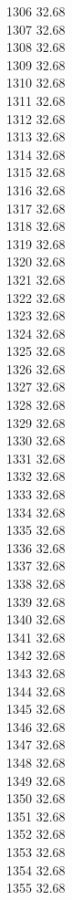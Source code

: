 1306	32.68\\
1307	32.68\\
1308	32.68\\
1309	32.68\\
1310	32.68\\
1311	32.68\\
1312	32.68\\
1313	32.68\\
1314	32.68\\
1315	32.68\\
1316	32.68\\
1317	32.68\\
1318	32.68\\
1319	32.68\\
1320	32.68\\
1321	32.68\\
1322	32.68\\
1323	32.68\\
1324	32.68\\
1325	32.68\\
1326	32.68\\
1327	32.68\\
1328	32.68\\
1329	32.68\\
1330	32.68\\
1331	32.68\\
1332	32.68\\
1333	32.68\\
1334	32.68\\
1335	32.68\\
1336	32.68\\
1337	32.68\\
1338	32.68\\
1339	32.68\\
1340	32.68\\
1341	32.68\\
1342	32.68\\
1343	32.68\\
1344	32.68\\
1345	32.68\\
1346	32.68\\
1347	32.68\\
1348	32.68\\
1349	32.68\\
1350	32.68\\
1351	32.68\\
1352	32.68\\
1353	32.68\\
1354	32.68\\
1355	32.68\\
